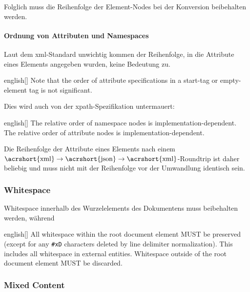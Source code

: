Folglich muss die Reihenfolge der Element-Nodes bei der Konversion beibehalten werden.

\paragraph{Ordnung von Attributen und Namespaces}

Laut dem \acrshort{xml}-Standard unwichtig kommen der Reihenfolge, in die Attribute eines Elements angegeben wurden, keine Bedeutung zu.

\begin{foreigndisplayquote}{english}[{\cite[Abschnitt~3.1]{maler2008xml}}]
Note that the order of attribute specifications in a start-tag or empty-element tag is not significant.
\end{foreigndisplayquote}

Dies wird auch von der \acrshort{xpath}-Spezifikation untermauert:

\begin{foreigndisplayquote}{english}[{\cite[Abschnitt~5]{clark1999xpath1}}]
The relative order of namespace nodes is implementation-dependent. The relative order of attribute nodes is implementation-dependent.
\end{foreigndisplayquote}

Die Reihenfolge der Attribute eines Elements nach einem $\text{\acrshort{xml}}\rightarrow{}\text{\acrshort{json}}\rightarrow{}\text{\acrshort{xml}}$-Roundtrip ist daher beliebig und muss nicht mit der Reihenfolge vor der Umwandlung identisch sein.

\subsubsection{Whitespace}

Whitespace innerhalb des Wurzelelements des Dokumentens muss beibehalten werden, während 

\begin{foreigndisplayquote}{english}[{\cite[Abschnitt~2.1]{boyer2001c14n}}]
    All whitespace within the root document element MUST be preserved (except for any \texttt{\#xD} characters deleted by line delimiter normalization). This includes all whitespace in external entities. Whitespace outside of the root document element MUST be discarded.
\end{foreigndisplayquote}

\subsubsection{Mixed Content}

